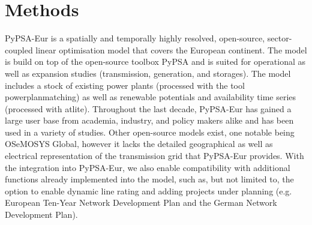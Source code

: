 \documentclass[fleqn,10pt]{wlscirep}
\let\autocite\cite
\begin{document}
\section*{Methods}
PyPSA-Eur is a spatially and temporally highly resolved, open-source, sector-coupled linear optimisation model that covers the European continent.\autocite{horschPyPSAEurOpenOptimisation2018} The model is build on top of the open-source toolbox PyPSA \autocite{brownPyPSAPythonPower2018} and is suited for operational as well as expansion studies (transmission, generation, and storages). The model includes a stock of existing power plants (processed with the tool powerplanmatching\autocite{gotzensPerformingEnergyModelling2019}) as well as renewable potentials and availability time series (processed with atlite\autocite{hofmannAtliteLightweightPython2021}).
Throughout the last decade, PyPSA-Eur has gained a large user base from academia, industry, and policy makers alike and has been used in a variety of studies.\autocite{neumannPotentialRoleHydrogen2023,victoriaSpeedTechnologicalTransformations2022,brownUltralongdurationEnergyStorage2023,glaumOffshorePowerHydrogen2024,riepinMeansCostsSystemlevel2024,rahdanDistributedPhotovoltaicsProvides2024,grochowiczUsingPowerSystem2024,transnetbwStromnetz2050Studie2022} Other open-source models exist, one notable being OSeMOSYS Global,\autocite{barnesOSeMOSYSGlobalOpensource2022} however it lacks the detailed geographical as well as electrical representation of the transmission grid that PyPSA-Eur provides. With the integration into PyPSA-Eur, we also enable compatibility with additional functions already implemented into the model, such as, but not limited to, the option to enable dynamic line rating\autocite{glaumLeveragingExistingGerman2023} and adding projects under planning (e.g. European Ten-Year Network Development Plan\autocite{entso-eTenYearNetworkDevelopment2020} and the German Network Development Plan\autocite{bnetzaBestaetigungNetzentwicklungsplanStrom2024}).
\end{document}

